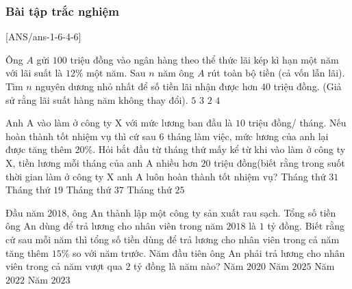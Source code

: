 \subsubsection{Bài tập trắc nghiệm}
[ANS/ans-1-6-4-6]
\begin{ex}
	Ông $A$ gửi $100$ triệu đồng vào ngân hàng theo thể thức lãi kép kì hạn một năm với lãi suất là $12\%$ một năm. Sau $n$ năm ông $A$ rút toàn bộ tiền (cả vốn lẫn lãi). Tìm $n$ nguyên dương nhỏ nhất để số tiền lãi nhận được hơn $40$ triệu đồng. (Giả sử rằng lãi suất hàng năm không thay đổi).
	\choice
	{$5$}
	{\True $3$}
	{$2$}
	{$4$}
\end{ex}
\begin{ex}
	Anh A vào làm ở công ty X với mức lương ban đầu là $10$ triệu đồng/ tháng. Nếu hoàn thành tốt nhiệm vụ thì cứ sau $6$ tháng làm việc, mức lương của anh lại được tăng thêm 20\%. Hỏi bắt đầu từ tháng thứ mấy kể từ khi vào làm ở công ty X, tiền lương mỗi tháng của anh A nhiều hơn $20$ triệu đồng(biết rằng trong suốt thời gian làm ở công ty X anh A luôn hoàn thành tốt nhiệm vụ?
	\choice
	{Tháng thứ $31$}
	{Tháng thứ $19$}
	{Tháng thứ $37$}
	{\True Tháng thứ $25$}
\end{ex}
\begin{ex}
	Đầu năm $2018$, ông An thành lập một công ty sản xuất rau sạch. Tổng số tiền ông An dùng để trả lương
	cho nhân viên trong năm $2018$ là $1$ tỷ đồng. Biết rằng cứ sau mỗi năm thì tổng số tiền dùng để trả lương cho nhân
	viên trong cả năm tăng thêm $15\%$ so với năm trước. Năm đầu tiên ông An phải trả lương cho nhân viên trong cả
	năm vượt qua $2$ tỷ đồng là năm nào?
	\choice
	{Năm $2020$}
	{Năm $2025$}
	{Năm $2022$}
	{\True Năm $2023$}
\end{ex}
